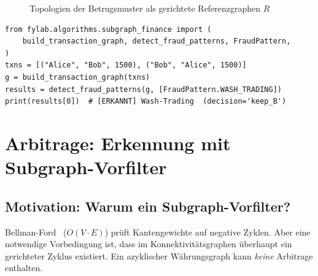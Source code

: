 \documentclass[a4paper,12pt]{article}
\begin{document}
\begin{figure}[h]
    \centering
    \caption{Topologien der Betrugsmuster als gerichtete Referenzgraphen $R$}
\end{figure}

\begin{lstlisting}[caption=Betrugserkennung -- Anwendung von subgraph\_contains]
from fylab.algorithms.subgraph_finance import (
    build_transaction_graph, detect_fraud_patterns, FraudPattern,
)
txns = [("Alice", "Bob", 1500), ("Bob", "Alice", 1500)]
g = build_transaction_graph(txns)
results = detect_fraud_patterns(g, [FraudPattern.WASH_TRADING])
print(results[0])  # [ERKANNT] Wash-Trading  (decision='keep_B')
\end{lstlisting}

\section{Arbitrage: Erkennung mit Subgraph-Vorfilter}
\label{sec:arbitrage}

\subsection{Motivation: Warum ein Subgraph-Vorfilter?}

Bellman-Ford~\cite{bellman1958, cormen2022} (\(O(V \cdot E)\)) prüft Kantengewichte auf negative Zyklen.
Aber eine notwendige Vorbedingung ist, dass im Konnektivitätsgraphen überhaupt
ein gerichteter Zyklus existiert. Ein azyklischer Währungsgraph kann
\emph{keine} Arbitrage enthalten.
\end{document}
